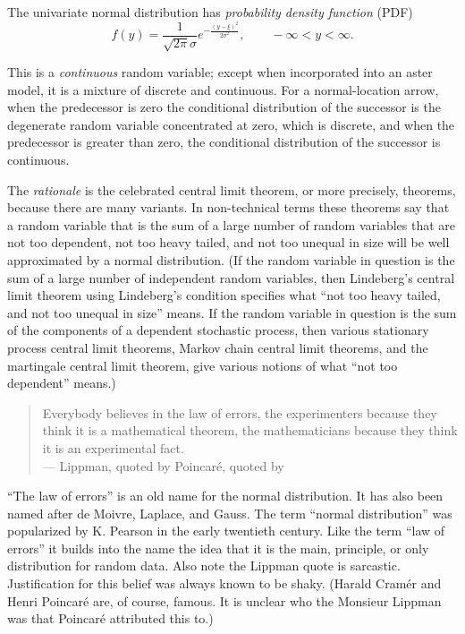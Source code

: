 \begin{sloppypar}
The univariate normal distribution has \emph{probability density function}
(PDF)
\begin{equation} \label{eq:normal-pdf}
   f(y) = \frac{1}{\sqrt{2 \pi} \sigma} e^{- \frac{(y - \xi)^2}{2 \sigma^2}},
   \qquad - \infty < y < \infty.
\end{equation}
\end{sloppypar}

This is a \emph{continuous} random variable;
except when incorporated into an aster model, it is a mixture of discrete
and continuous.  For a normal-location arrow, when the predecessor is zero
the conditional distribution of the successor is the degenerate random variable
concentrated at zero, which is discrete, and when the predecessor is greater
than zero, the conditional distribution of the successor is continuous.

The \emph{rationale} is the celebrated central limit theorem,
or more precisely, theorems, because there are many variants.
In non-technical terms these theorems say that a random variable that is the sum
of a large number of random variables that are not too dependent,
not too heavy tailed, and not too unequal in size will be well approximated
by a normal distribution.  (If the random variable in question is the
sum of a large number of independent random variables, then Lindeberg's
central limit theorem using Lindeberg's condition specifies what
``not too heavy tailed, and not too unequal in size'' means.
If the random variable in question is the
sum of the components of a dependent stochastic process, then various
stationary process central limit theorems, Markov chain central limit theorems,
and the martingale central limit theorem, give various notions of what
``not too dependent'' means.)
\begin{quotation}
Everybody believes in the law of errors, the experimenters because they
think it is a mathematical theorem, the mathematicians because they
think it is an experimental fact.
\\
\hspace*{\fill} --- Lippman, quoted by Poincar\'{e}, quoted by \citet{cramer}
\end{quotation}
``The law of errors'' is an old name for the normal distribution.
It has also been named after de Moivre, Laplace, and Gauss.
The term ``normal distribution'' was popularized by K. Pearson in the early
twentieth century.  Like the term ``law of errors'' it builds into the name
the idea that it is the main, principle, or only distribution for random data.
Also note the Lippman quote is sarcastic.  Justification
for this belief was always known to be shaky.
(Harald Cram\'{e}r and Henri Poincar\'{e} are, of course, famous.  It is
unclear who the Monsieur Lippman was that Poincar\'{e} attributed this to.)

